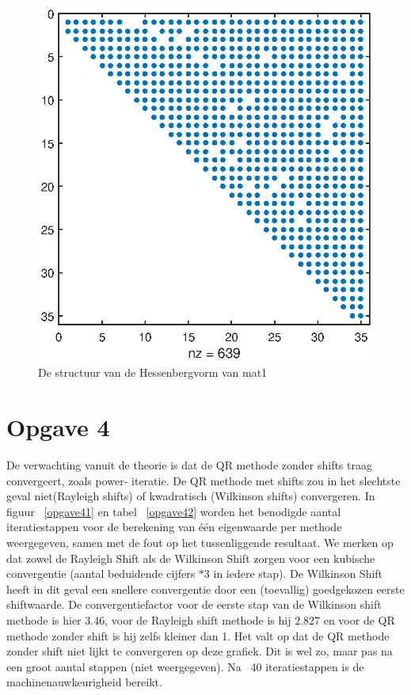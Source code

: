 \documentclass[]{article}
\newcommand{\opgave}[1]{\pagebreak\section*{Opgave #1}}
\begin{document}
\begin{figure}[h]
\includegraphics[width=1\textwidth]{opgave3.eps}
\caption{De structuur van de Hessenbergvorm van mat1}
\label{opgave3}
\end{figure}

\opgave{4}

De verwachting vanuit de theorie is dat de QR methode zonder shifts traag convergeert, zoals power- iteratie. De QR methode met shifts zou in het slechtste geval niet(Rayleigh shifts) of kwadratisch (Wilkinson shifts) convergeren. In figuur ~\ref{opgave41} en tabel ~\ref{opgave42} worden het benodigde aantal iteratiestappen voor de berekening van \'{e}\'{e}n eigenwaarde per methode weergegeven, samen met de fout op het tussenliggende resultaat. We merken op dat  zowel de Rayleigh Shift als de Wilkinson Shift zorgen voor een kubische convergentie (aantal beduidende cijfers $* 3$ in iedere stap). 
De Wilkinson Shift heeft in dit geval een snellere convergentie door een (toevallig) goedgekozen eerste shiftwaarde. De convergentiefactor voor de eerste stap van de Wilkinson shift methode is hier $3.46$, voor de Rayleigh shift methode is hij $2.827$ en voor de QR methode zonder shift is hij zelfs kleiner dan 1. Het valt op dat de QR methode zonder shift niet lijkt te convergeren op deze grafiek. Dit is wel zo, maar pas na een groot aantal stappen (niet weergegeven). Na ~40 iteratiestappen is de machinenauwkeurigheid bereikt. 
\end{document}
